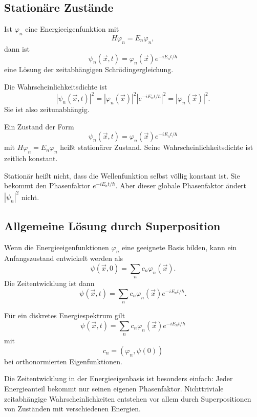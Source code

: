 \subsection{Stationäre Zustände}

Ist $\varphi_n$ eine Energieeigenfunktion mit
\[
    H\varphi_n=E_n\varphi_n,
\]
dann ist
\[
    \psi_n(\vec{x},t)=\varphi_n(\vec{x})e^{-iE_nt/\hbar}
\]
eine Lösung der zeitabhängigen Schrödingergleichung.

Die Wahrscheinlichkeitsdichte ist
\[
    |\psi_n(\vec{x},t)|^2
    =|\varphi_n(\vec{x})|^2\left|e^{-iE_nt/\hbar}\right|^2
    =|\varphi_n(\vec{x})|^2.
\]
Sie ist also zeitunabhängig.

\begin{definitionbox}
Ein Zustand der Form
\[
    \psi_n(\vec{x},t)=\varphi_n(\vec{x})e^{-iE_nt/\hbar}
\]
mit $H\varphi_n=E_n\varphi_n$ heißt stationärer Zustand. Seine Wahrscheinlichkeitsdichte ist zeitlich konstant.
\end{definitionbox}

\begin{notebox}
Stationär heißt nicht, dass die Wellenfunktion selbst völlig konstant ist. Sie bekommt den Phasenfaktor $e^{-iE_nt/\hbar}$. Aber dieser globale Phasenfaktor ändert $|\psi_n|^2$ nicht.
\end{notebox}

\subsection{Allgemeine Lösung durch Superposition}

Wenn die Energieeigenfunktionen $\varphi_n$ eine geeignete Basis bilden, kann ein Anfangszustand entwickelt werden als
\[
    \psi(\vec{x},0)=\sum_n c_n\varphi_n(\vec{x}).
\]
Die Zeitentwicklung ist dann
\[
    \psi(\vec{x},t)=\sum_n c_n\varphi_n(\vec{x})e^{-iE_nt/\hbar}.
\]

\begin{formulabox}
Für ein diskretes Energiespektrum gilt
\[
    \boxed{\psi(\vec{x},t)=\sum_n c_n\varphi_n(\vec{x})e^{-iE_nt/\hbar}}
\]
mit
\[
    c_n=(\varphi_n,\psi(0))
\]
bei orthonormierten Eigenfunktionen.
\end{formulabox}

\begin{conceptbox}
Die Zeitentwicklung in der Energieeigenbasis ist besonders einfach: Jeder Energieanteil bekommt nur seinen eigenen Phasenfaktor. Nichttriviale zeitabhängige Wahrscheinlichkeiten entstehen vor allem durch Superpositionen von Zuständen mit verschiedenen Energien.
\end{conceptbox}


